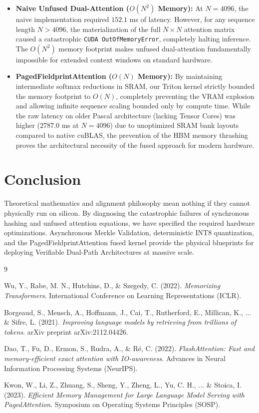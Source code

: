 \documentclass{article}
\begin{document}
\begin{itemize}
    \item \textbf{Naive Unfused Dual-Attention ($O(N^2)$ Memory):} At $N=4096$, the naive implementation required $152.1$ ms of latency. However, for any sequence length $N > 4096$, the materialization of the full $N \times N$ attention matrix caused a catastrophic \texttt{CUDA OutOfMemoryError}, completely halting inference. The $O(N^2)$ memory footprint makes unfused dual-attention fundamentally impossible for extended context windows on standard hardware.
    \item \textbf{PagedFieldprintAttention ($O(N)$ Memory):} By maintaining intermediate softmax reductions in SRAM, our Triton kernel strictly bounded the memory footprint to $O(N)$, completely preventing the VRAM explosion and allowing infinite sequence scaling bounded only by compute time. While the raw latency on older Pascal architecture (lacking Tensor Cores) was higher ($2787.0$ ms at $N=4096$) due to unoptimized SRAM bank layouts compared to native cuBLAS, the prevention of the HBM memory thrashing proves the architectural necessity of the fused approach for modern hardware.
\end{itemize}

\section{Conclusion}
Theoretical mathematics and alignment philosophy mean nothing if they cannot physically run on silicon. By diagnosing the catastrophic failures of synchronous hashing and unfused attention equations, we have specified the required hardware optimizations. Asynchronous Merkle Validation, deterministic INT8 quantization, and the PagedFieldprintAttention fused kernel provide the physical blueprints for deploying Verifiable Dual-Path Architectures at massive scale.

\begin{thebibliography}{9}

Wu, Y., Rabe, M. N., Hutchins, D., \& Szegedy, C. (2022). 
\textit{Memorizing Transformers}. 
International Conference on Learning Representations (ICLR).

Borgeaud, S., Mensch, A., Hoffmann, J., Cai, T., Rutherford, E., Millican, K., ... \& Sifre, L. (2021). 
\textit{Improving language models by retrieving from trillions of tokens}. 
arXiv preprint arXiv:2112.04426.

Dao, T., Fu, D., Ermon, S., Rudra, A., \& Ré, C. (2022). 
\textit{FlashAttention: Fast and memory-efficient exact attention with IO-awareness}. 
Advances in Neural Information Processing Systems (NeurIPS).

Kwon, W., Li, Z., Zhuang, S., Sheng, Y., Zheng, L., Yu, C. H., ... \& Stoica, I. (2023). 
\textit{Efficient Memory Management for Large Language Model Serving with PagedAttention}. 
Symposium on Operating Systems Principles (SOSP).

\end{thebibliography}
\end{document}
